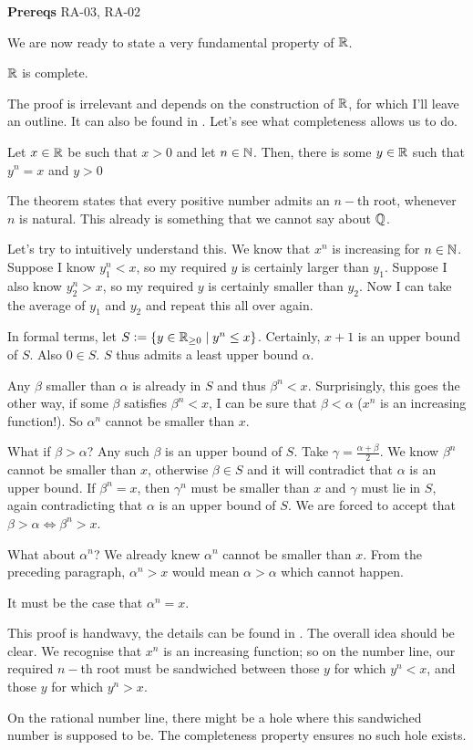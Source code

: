 

\textbf{Prereqs} RA-03, RA-02

We are now ready to state a very fundamental property of $\mathbb{R}$.
\begin{SNP}{\thm}{$\mathbb{R}$ is complete.}
\end{SNP}
The proof is irrelevant and depends on the construction of $\mathbb{R}$, for which I'll leave an outline. It can also be found in \cite{Rudin}. Let's see what completeness allows us to do.
\begin{SNP}{\thm}{Let $x \in \mathbb{R}$ be such that $x > 0$ and let $n \in \mathbb{N}$. Then, there is some $y \in \mathbb{R}$ such that $y^n = x$ and $y > 0$}
\end{SNP}
The theorem states that every positive number admits an $n-$th root, whenever $n$ is natural. This already is something that we cannot say about $\mathbb{Q}$.

Let's try to intuitively understand this. We know that $x^n$ is increasing for $n \in \mathbb{N}$. Suppose I know $y_1^n < x$, so my required $y$ is certainly larger than $y_1$. Suppose I also know $y_2^n > x$, so my required $y$ is certainly smaller than $y_2$. Now I can take the average of $y_1$ and $y_2$ and repeat this all over again.

In formal terms, let $S := \{y \in \mathbb{R}_{\geq 0} \space \mid \space y^n \leq x\}$. Certainly, $x + 1$ is an upper bound of $S$. Also $0 \in S$. $S$ thus admits a least upper bound $\alpha$.

Any $\beta$ smaller than $\alpha$ is already in $S$ and thus $\beta^n < x$. Surprisingly, this goes the other way, if some $\beta$ satisfies $\beta ^ n < x$, I can be sure that $\beta < \alpha$ ($x^n$ is an increasing function!). So $\alpha^n$ cannot be smaller than $x$.

What if $\beta > \alpha$? Any such $\beta$ is an upper bound of $S$. Take $\gamma = \frac{\alpha + \beta}{2}$. We know $\beta ^n$ cannot be smaller than $x$, otherwise $\beta \in S$ and it will contradict that $\alpha$ is an upper bound. If $\beta^n = x$, then $\gamma^n$ must be smaller than $x$ and $\gamma$ must lie in $S$, again contradicting that $\alpha$ is an upper bound of $S$. We are forced to accept that $\beta > \alpha \iff \beta^n > x$.

What about $\alpha^n$? We already knew $\alpha^n$ cannot be smaller than $x$. From the preceding paragraph, $\alpha^n > x$ would mean $\alpha > \alpha$ which cannot happen.

It must be the case that $\alpha^n = x$. 

This proof is handwavy, the details can be found in \cite{Rudin}. The overall idea should be clear. We recognise that $x^n$ is an increasing function; so on the number line, our required $n-$th root must be sandwiched between those $y$ for which $y^n < x$, and those $y$ for which $y^n > x$.

On the rational number line, there might be a hole where this sandwiched number is supposed to be. The completeness property ensures no such hole exists.


